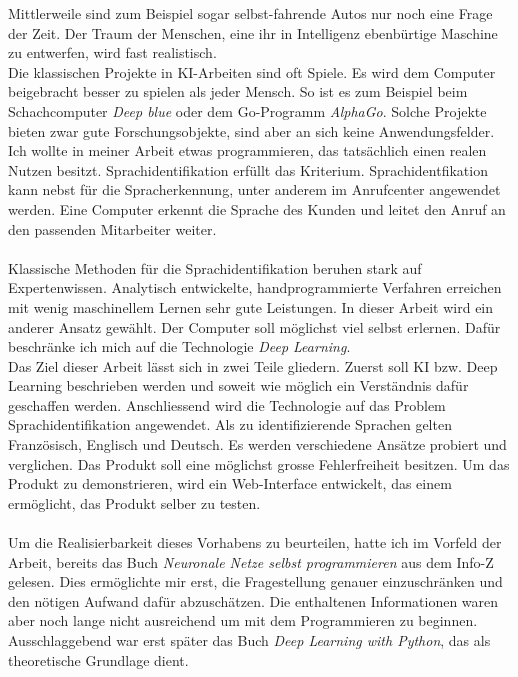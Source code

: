 Mittlerweile sind zum Beispiel sogar selbst-fahrende Autos nur noch eine Frage der Zeit. Der Traum der Menschen, eine ihr in Intelligenz ebenbürtige Maschine zu entwerfen, wird fast realistisch.
\\
Die klassischen Projekte in KI-Arbeiten sind oft Spiele. Es wird dem Computer beigebracht besser zu spielen als jeder Mensch. So ist es zum Beispiel beim Schachcomputer
\textit{Deep blue}\parencite{deepblue} oder dem Go-Programm \textit{AlphaGo}\parencite{alphago}.
Solche Projekte bieten zwar gute Forschungsobjekte, sind aber an sich keine Anwendungsfelder. Ich wollte in meiner Arbeit etwas programmieren, das tatsächlich einen realen Nutzen
besitzt.
Sprachidentifikation erfüllt das Kriterium. Sprachidentfikation kann nebst für die Spracherkennung, unter anderem im Anrufcenter angewendet werden. Eine Computer erkennt die Sprache des Kunden und leitet den Anruf an den passenden Mitarbeiter weiter.
\\ \\
Klassische Methoden für die Sprachidentifikation beruhen stark auf Expertenwissen. Analytisch entwickelte, handprogrammierte Verfahren erreichen mit wenig maschinellem Lernen sehr gute Leistungen. In dieser Arbeit wird ein anderer Ansatz gewählt. Der Computer soll möglichst viel selbst erlernen. Dafür beschränke ich mich auf die Technologie \textit{Deep Learning}. 
\\ 
Das Ziel dieser Arbeit lässt sich in zwei Teile gliedern. Zuerst soll KI bzw. Deep Learning beschrieben werden und soweit wie möglich ein Verständnis dafür geschaffen werden.
Anschliessend wird die Technologie auf das Problem Sprachidentifikation angewendet. Als zu identifizierende Sprachen gelten Französisch, Englisch und Deutsch. Es
werden verschiedene Ansätze probiert und verglichen. Das Produkt soll eine möglichst grosse Fehlerfreiheit besitzen. Um das Produkt zu demonstrieren, wird ein Web-Interface
entwickelt, das einem ermöglicht, das Produkt selber zu testen.
\\ \\
Um die Realisierbarkeit dieses Vorhabens zu beurteilen, hatte ich im Vorfeld der Arbeit, bereits das Buch  \textit{Neuronale Netze selbst programmieren}\parencite{neuronale_netze} aus dem Info-Z gelesen. Dies ermöglichte mir erst, die Fragestellung genauer einzuschränken und den nötigen Aufwand dafür abzuschätzen. Die enthaltenen Informationen waren aber noch lange nicht ausreichend um mit dem Programmieren zu beginnen. Ausschlaggebend war erst später das Buch \textit{Deep Learning with Python}\parencite{chollet}, das als theoretische Grundlage dient. 
